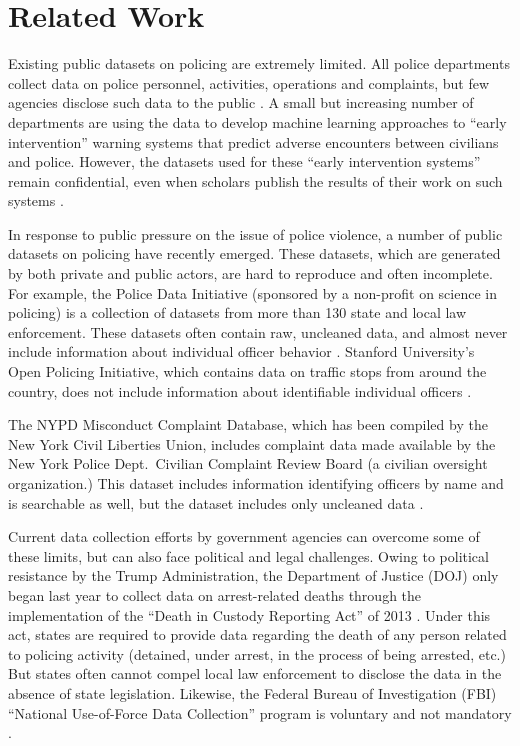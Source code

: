 \section{Related Work}\label{sec:related}

Existing public datasets on policing are extremely limited. All police
departments collect data on police personnel, activities, operations and
complaints, but few agencies disclose such data to the public \cite{Jackman21}.
A small but increasing number of departments are using the data to develop
machine learning approaches to “early intervention” warning systems that
predict adverse encounters between civilians and police. However, the datasets
used for these “early intervention systems” remain confidential, even when
scholars publish the results of their work on such systems \cite{Helsby18}.

In response to public pressure on the issue of police violence, a number of
public datasets on policing have recently emerged. These datasets, which are
generated by both private and public actors, are hard to reproduce and often
incomplete. For example, the Police Data Initiative (sponsored by a non-profit
on science in policing) is a collection of datasets from more than 130 state
and local law enforcement. These datasets often contain raw, uncleaned data,
and almost never include information about individual officer behavior
\cite{pdi}.  Stanford University’s Open Policing Initiative, which contains
data on traffic stops from around the country, does not include information
about identifiable individual officers \cite{sopp}.

The NYPD Misconduct Complaint Database, which has been compiled by the New York
Civil Liberties Union, includes complaint data made available by the New York
Police Dept.\ Civilian Complaint Review Board (a civilian oversight
organization.) This dataset includes information identifying officers by name
and is searchable as well, but the dataset includes only uncleaned data \cite{nmcd}.

 
Current data collection efforts by government agencies can overcome some of
these limits, but can also face political and legal challenges. Owing to
political resistance by the Trump Administration, the Department of Justice
(DOJ) only began last year to collect data on arrest-related deaths through the
implementation of the ``Death in Custody Reporting Act'' of 2013
\cite{DICRA2013}. Under this act, states are required to provide data regarding
the death of any person related to policing activity (detained, under arrest,
in the process of being arrested, etc.) But states often cannot compel local
law enforcement to disclose the data in the absence of state legislation.
Likewise, the Federal Bureau of Investigation (FBI) ``National Use-of-Force
Data Collection'' program is voluntary and not mandatory \cite{Gardner2020}.

